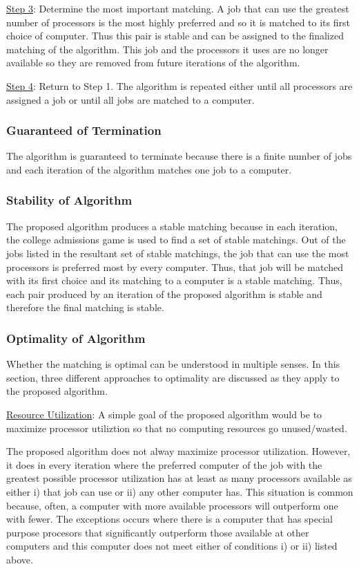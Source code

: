 \documentclass[conference]{IEEEtran}
\begin{document}
\underline{Step 3}: Determine the most important matching.
A job that can use the greatest number of processors is the
most highly preferred and so it is matched to its first choice
of computer. Thus this pair is stable and can be assigned to 
the finalized matching of the algorithm. 
This job and the processors it uses are no longer available
so they are removed from future iterations of the algorithm.

\underline{Step 4}: Return to Step 1.
The algorithm is repeated either until all processors are 
assigned a job or until all jobs are matched 
to a computer.

\subsubsection{Guaranteed of Termination}
The algorithm is guaranteed to terminate because there is a 
finite number of jobs and each iteration of the algorithm
matches one job to a computer.

\subsubsection{Stability of Algorithm}
The proposed algorithm produces a stable matching because in
each iteration, the college admissions game is used to find
a set of stable matchings.
Out of the jobs listed in the resultant set of stable matchings,
the job that can use the most processors is preferred most
by every computer. Thus, that job will be matched with its first 
choice and its matching to a computer is a stable matching.
Thus, each pair produced by an iteration of the proposed
algorithm is stable and therefore the final matching is stable.

\subsubsection{Optimality of Algorithm}
Whether the matching is optimal can be understood in multiple senses.
In this section, three different approaches to optimality are 
discussed as they apply to the proposed algorithm.

\underline{Resource Utilization}:
A simple goal of the proposed algorithm would be to 
maximize processor utiliztion so that no computing 
resources go unused/wasted.

The proposed algorithm does not alway maximize processor 
utilization. However, it does in every iteration 
where the preferred computer of the job with
the greatest possible processor utilization
has at least as many processors 
available as either
    i) that job can use or
    ii) any other computer has.
This situation is common because, often, a computer with more 
available processors will outperform
one with fewer. The exceptions occurs where there is 
a computer that has special purpose procesors
that significantly outperform those available at other 
computers and this computer does not meet either 
of conditions i) or ii) listed above.
\end{document}
